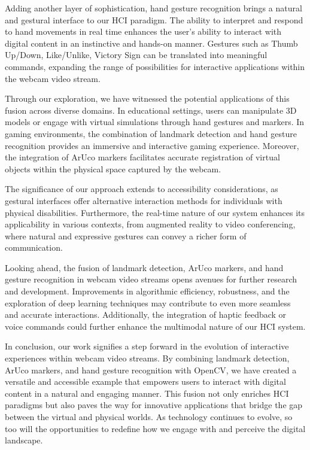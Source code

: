 \documentclass[journal]{IEEEtran}
\begin{document}
Adding another layer of sophistication, hand gesture recognition brings a natural and gestural interface to our HCI paradigm. 
The ability to interpret and respond to hand movements in real time enhances the user's ability to interact with digital content 
in an instinctive and hands-on manner. Gestures such as Thumb Up/Down, Like/Unlike, Victory Sign can be translated into meaningful
commands, expanding the range of possibilities for interactive applications within the webcam video stream.

Through our exploration, we have witnessed the potential applications of this fusion across diverse domains. In educational settings, 
users can manipulate 3D models or engage with virtual simulations through hand gestures and markers. In gaming environments, 
the combination of landmark detection and hand gesture recognition provides an immersive and interactive gaming experience. 
Moreover, the integration of ArUco markers facilitates accurate registration of virtual objects within the physical space captured 
by the webcam.

The significance of our approach extends to accessibility considerations, as gestural interfaces offer alternative interaction methods 
for individuals with physical disabilities. Furthermore, the real-time nature of our system enhances its applicability in various contexts, 
from augmented reality to video conferencing, where natural and expressive gestures can convey a richer form of communication.

Looking ahead, the fusion of landmark detection, ArUco markers, and hand gesture recognition in webcam video streams opens avenues 
for further research and development. Improvements in algorithmic efficiency, robustness, and the exploration of deep learning 
techniques may contribute to even more seamless and accurate interactions. Additionally, the integration of haptic feedback or 
voice commands could further enhance the multimodal nature of our HCI system.

In conclusion, our work signifies a step forward in the evolution of interactive experiences within webcam video streams. By combining 
landmark detection, ArUco markers, and hand gesture recognition with OpenCV, we have created a versatile and accessible example 
that empowers users to interact with digital content in a natural and engaging manner. This fusion not only enriches HCI paradigms 
but also paves the way for innovative applications that bridge the gap between the virtual and physical worlds. As technology continues 
to evolve, so too will the opportunities to redefine how we engage with and perceive the digital landscape.
\end{document}
